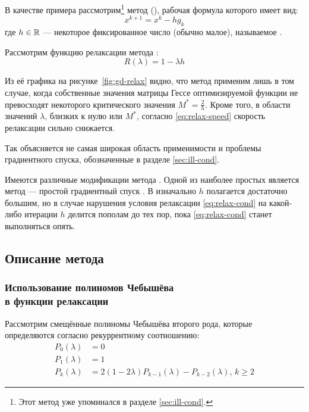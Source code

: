 В качестве примера рассмотрим\footnote{Этот метод уже упоминался в
  разделе \ref{sec:ill-cond}.} метод  (\gd{}), рабочая формула которого имеет вид:
\begin{equation}
  \label{eq:gd-workhorse}
  x^{k+1}=x^k-hg_k
\end{equation}
где $h\in\mathbb{R}$ — некоторое фиксированное число (обычно малое),
называемое .

Рассмотрим функцию релаксации метода \gd{}:
\begin{equation}
  \label{eq:gd-relax}
  R(\lambda) = 1 - \lambda h
\end{equation}



Из её графика на рисунке \ref{fig:gd-relax} видно, что метод применим
лишь в том случае, когда собственные значения матрицы Гессе
оптимизируемой функции не превосходят некоторого критического значения
$M^*=\frac{2}{h}$. Кроме того, в области значений $\lambda$, близких к
нулю или $M^*$, согласно \eqref{eq:relax-speed} скорость релаксации
сильно снижается. 

Так объясняется не самая широкая область применимости \gd{} и проблемы
градиентного спуска, обозначенные в разделе \ref{sec:ill-cond}.

Имеются различные модификации метода \gd{}. Одной из наиболее простых
является метод \rgd{} — простой градиентный спуск . В \rgd{} изначально $h$ полагается достаточно большим, но в
случае нарушения условия релаксации \eqref{eq:relax-cond} на
какой-либо итерации $h$ делится пополам до тех пор, пока
\eqref{eq:relax-cond} станет выполняться опять.

\subsection{Описание метода \relch{}}

\subsubsection{Использование полиномов Чебышёва\\
  в функции релаксации}

Рассмотрим смещённые полиномы Чебышёва второго рода, которые
определяются согласно рекуррентному соотношению:
\begin{align}
  \label{eq:chebyshev}
  P_0(\lambda) &= 0 \\
  P_1(\lambda) &= 1 \\
  P_k(\lambda) &= 2(1-2\lambda)P_{k-1}(\lambda) - P_{k-2}(\lambda),\, k
  \geq 2
\end{align}

